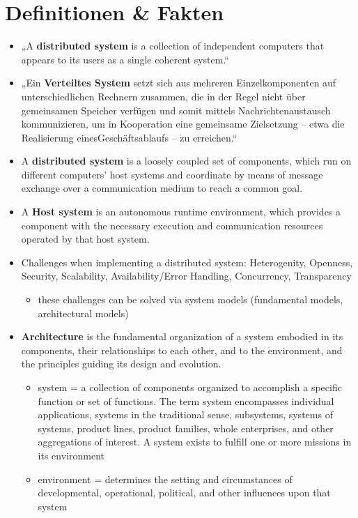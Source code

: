 \documentclass[11pt]{article}
\author{eo shiru}
\date{\today}
\title{}
\begin{document}
\tableofcontents


\section{Definitionen \& Fakten}
\label{sec:orgd4c699c}
\begin{itemize}
\item „A \textbf{distributed system} is a collection of independent computers that appears to its users as a single coherent system.“
\item „Ein \textbf{Verteiltes System} setzt sich aus mehreren Einzelkomponenten auf unterschiedlichen Rechnern zusammen, die in der Regel nicht über gemeinsamen Speicher verfügen und somit mittels Nachrichtenaustausch kommunizieren, um in Kooperation eine gemeinsame Zielsetzung – etwa die Realisierung einesGeschäftsablaufs – zu erreichen.“
\item A \textbf{distributed system} is a loosely coupled set of components, which run on different computers’ host systems and coordinate by means of message exchange over a communication medium to reach a common goal.
\item A \textbf{Host system} is an autonomous runtime environment, which provides a component with the necessary execution and communication resources operated by that host system.
\item Challenges when implementing a distributed system: Heterogenity, Openness, Security, Scalability, Availability/Error Handling, Concurrency, Transparency
\begin{itemize}
\item these challenges can be solved via system models (fundamental models, architectural models)
\end{itemize}
\item \textbf{Architecture} is the fundamental organization of a system embodied in its components, their relationships to each other, and to the environment, and the principles guiding its design and evolution.
\begin{itemize}
\item system = a collection of components organized to accomplish a specific function or set of functions. The term system encompasses individual applications, systems in the traditional sense, subsystems, systems of systems, product lines, product families, whole enterprises, and other aggregations of interest. A system exists to fulfill one or more missions in its environment
\item environment = determines the setting and circumstances of developmental, operational, political, and other influences upon that system

\end{itemize}
\end{itemize}
\end{document}
